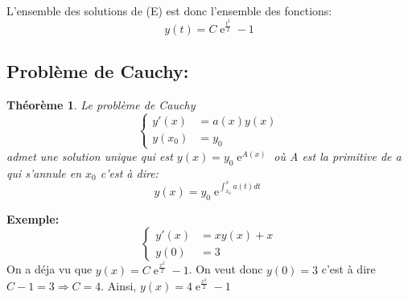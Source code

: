 \documentclass[a4paper]{article}
\theoremstyle{break}
\newtheorem{theo}{Théorème}[section]
\DeclareMathOperator{\e}{e} %
\begin{document}
L'ensemble des solutions de (E) est donc l'ensemble des fonctions:
\[
  y(t) = C\e^{\frac{t^2}{2}} - 1
\]

\subsection{Problème de Cauchy:}
\begin{theo}{Le problème de Cauchy}
  \[
    \left\{
      \begin{array}{ll}
        y'(x)  &= a(x) y(x) \\
        y(x_0) &= y_0
      \end{array}
    \right.
  \]
  admet une solution unique qui est $y(x) = y_0 \e^{A(x)}$ où A est
  la primitive de a qui s'annule en $x_0$ c'est à dire:
  \[
    y(x) = y_0 \e^{\int_{x_0}^{x} a(t) dt}
  \]
\end{theo}

\textbf{Exemple:}
\[
    \left\{
      \begin{array}{ll}
        y'(x)  &= xy(x) + x \\
        y(0) &= 3
      \end{array}
    \right.
  \]
  On a déja vu que $y(x) = C\e^{\frac{x^2}{2}} - 1$. On veut donc
  $y(0) = 3$ c'est à dire $C - 1 = 3 \Rightarrow C = 4$. Ainsi, $y(x)
  = 4 \e^{\frac{x^2}{2}} - 1$
\end{document}
